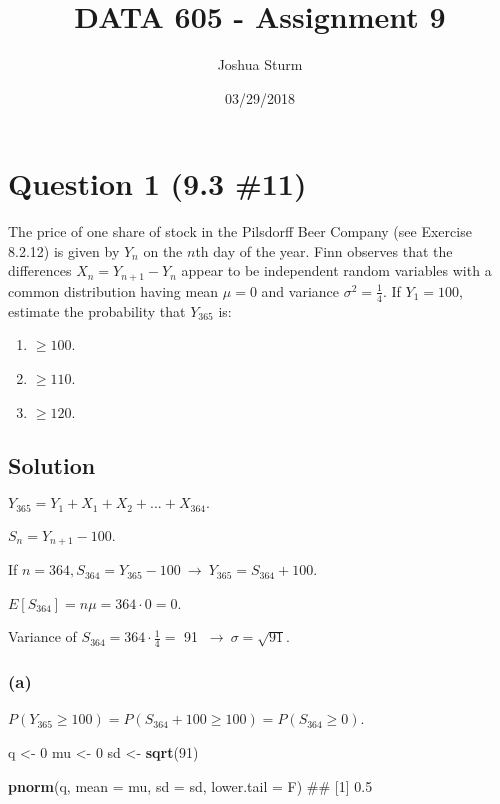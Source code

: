 \documentclass[]{article}
\title{DATA 605 - Assignment 9}
\author{Joshua Sturm}
\date{03/29/2018}
\newenvironment{Shaded}{\begin{snugshade}}{\end{snugshade}}
\newcommand{\KeywordTok}[1]{\textcolor[rgb]{0.13,0.29,0.53}{\textbf{#1}}}
\newcommand{\DataTypeTok}[1]{\textcolor[rgb]{0.13,0.29,0.53}{#1}}
\newcommand{\DecValTok}[1]{\textcolor[rgb]{0.00,0.00,0.81}{#1}}
\newcommand{\StringTok}[1]{\textcolor[rgb]{0.31,0.60,0.02}{#1}}
\newcommand{\NormalTok}[1]{#1}
\begin{document}
\maketitle

\section{Question 1 (9.3 \#11)}\label{question-1-9.3-11}

The price of one share of stock in the Pilsdorff Beer Company (see
Exercise 8.2.12) is given by \(Y_n\) on the \(n\)th day of the year.
Finn observes that the differences \(X_n = Y_{n+1} - Y_n\) appear to be
independent random variables with a common distribution having mean
\(\mu = 0\) and variance \(\sigma^2 = \frac{1}{4}\). If \(Y_1 = 100\),
estimate the probability that \(Y_{365}\) is:

\begin{enumerate}
\def\labelenumi{(\alph{enumi})}
\item
  \(\geq 100\).
\item
  \(\geq 110\).
\item
  \(\geq 120\).
\end{enumerate}

\subsection{Solution}\label{solution}

\(Y_{365} = Y_1 + X_1 + X_2 + ... + X_{364}.\)

\(S_n = Y_{n+1} - 100\).

If \(n = 364, S_{364} = Y_{365} - 100 \ \to \ Y_{365} = S_{364} + 100\).

\(E[S_{364}] = n\mu = 364\cdot 0 = 0\).

Variance of \(S_{364} = 364\cdot\frac{1}{4} =\) 91
\(\ \to \ \sigma = \sqrt{91}\).

\subsubsection{(a)}\label{a}

\(P(Y_{365} \geq 100) = P(S_{364} + 100 \geq 100) = P(S_{364} \geq 0)\).

\begin{Shaded}
\begin{Highlighting}[]
\NormalTok{q <-}\StringTok{ }\DecValTok{0}
\NormalTok{mu <-}\StringTok{ }\DecValTok{0}
\NormalTok{sd <-}\StringTok{ }\KeywordTok{sqrt}\NormalTok{(}\DecValTok{91}\NormalTok{)}

\KeywordTok{pnorm}\NormalTok{(q, }\DataTypeTok{mean =}\NormalTok{ mu, }\DataTypeTok{sd =}\NormalTok{ sd, }\DataTypeTok{lower.tail =}\NormalTok{ F)}
\NormalTok{## [1] 0.5}
\end{Highlighting}
\end{Shaded}
\end{document}
